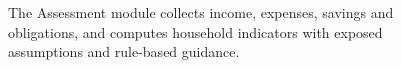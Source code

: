 
\begin{figure}[H]
\centering
{}
\caption{The Assessment module collects income, expenses, savings and obligations, and computes household indicators with exposed assumptions and rule-based guidance.}
\label{fig:assessment}
\end{figure}